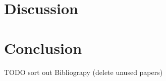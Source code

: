 \documentclass[a4paper,hidelinks,11pt,twoside]{memoir}
\begin{document}
\chapter{Discussion}
\label{ch:discussion}


\chapter{Conclusion}
\label{ch:conclusion}


TODO sort out Bibliograpy (delete unused papers)



%



\appendix



\end{document}
